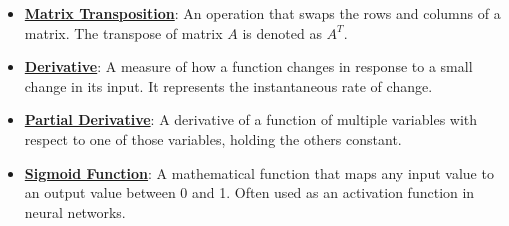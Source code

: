 \documentclass{article}%
\begin{document}
\begin{itemize}[leftmargin=*]
\item \href{https://purdue.brightspace.com/d2l/common/assets/pdfjs-d2l-dist/1.0.14-legacy/web/viewer.html?file=%2Fcontent%2Fenforced%2F1095467-wl.202510.CS.24300.001%2F04L1-Linear Algebra Primer.pdf%3Fou%3D1095467&lang=en-us&container=d2l-fileviewer-rendered-pdf&fullscreen=d2l-fileviewer-rendered-pdf-dialog&height=667#page=16}{\textbf{Matrix Transposition}}: An operation that swaps the rows and columns of a matrix. The transpose of matrix $A$ is denoted as $A^T$.%
\item \href{https://purdue.brightspace.com/d2l/common/assets/pdfjs-d2l-dist/1.0.14-legacy/web/viewer.html?file=%2Fcontent%2Fenforced%2F1095467-wl.202510.CS.24300.001%2F04L1-Linear Algebra Primer.pdf%3Fou%3D1095467&lang=en-us&container=d2l-fileviewer-rendered-pdf&fullscreen=d2l-fileviewer-rendered-pdf-dialog&height=667#page=21}{\textbf{Derivative}}: A measure of how a function changes in response to a small change in its input. It represents the instantaneous rate of change.%
\item \href{https://purdue.brightspace.com/d2l/common/assets/pdfjs-d2l-dist/1.0.14-legacy/web/viewer.html?file=%2Fcontent%2Fenforced%2F1095467-wl.202510.CS.24300.001%2F04L1-Linear Algebra Primer.pdf%3Fou%3D1095467&lang=en-us&container=d2l-fileviewer-rendered-pdf&fullscreen=d2l-fileviewer-rendered-pdf-dialog&height=667#page=19}{\textbf{Partial Derivative}}: A derivative of a function of multiple variables with respect to one of those variables, holding the others constant.%
\item \href{https://purdue.brightspace.com/d2l/common/assets/pdfjs-d2l-dist/1.0.14-legacy/web/viewer.html?file=%2Fcontent%2Fenforced%2F1095467-wl.202510.CS.24300.001%2F04L1-Linear Algebra Primer.pdf%3Fou%3D1095467&lang=en-us&container=d2l-fileviewer-rendered-pdf&fullscreen=d2l-fileviewer-rendered-pdf-dialog&height=667#page=21}{\textbf{Sigmoid Function}}: A mathematical function that maps any input value to an output value between 0 and 1. Often used as an activation function in neural networks.%
\end{itemize}%
\end{document}
